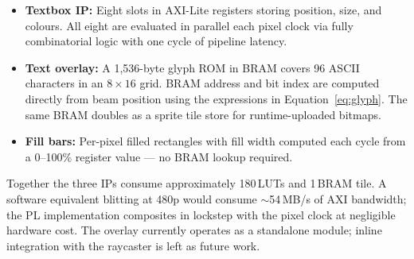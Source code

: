 \begin{itemize}
    \item \textbf{Textbox IP:} Eight slots in AXI-Lite registers storing 
    position, size, and colours. All eight are evaluated in parallel each 
    pixel clock via fully combinatorial logic with one cycle of pipeline 
    latency.

    \item \textbf{Text overlay:} A 1,536-byte glyph ROM in BRAM covers 96 
    ASCII characters in an $8\times16$ grid. BRAM address and bit index are 
    computed directly from beam position using the expressions in 
    Equation~\ref{eq:glyph}. The same BRAM doubles as a sprite tile store 
    for runtime-uploaded bitmaps.

    \item \textbf{Fill bars:} Per-pixel filled rectangles with fill width 
    computed each cycle from a 0--100\% register value --- no BRAM lookup 
    required.
\end{itemize}

Together the three IPs consume approximately 180\,LUTs and 1\,BRAM tile. 
A software equivalent blitting at 480p would consume $\sim$54\,MB/s of AXI 
bandwidth; the PL implementation composites in lockstep with the pixel 
clock at negligible hardware cost. The overlay currently operates as a 
standalone module; inline integration with the raycaster is left as future 
work.